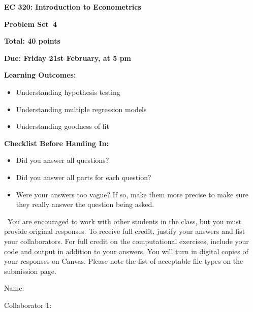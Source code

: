 \documentclass[11pt]{article}
\begin{document}
\begin{onehalfspacing}

\begin{center}
\textbf{EC 320: Introduction to Econometrics} \bigskip

\textbf{Problem Set\bigskip\ 4}
\bigskip
\end{center}


\noindent \textbf{Total: 40 points}

\noindent \textbf{Due: Friday 21st February, at 5 pm}

\bigskip

\noindent \textbf{Learning Outcomes:}
\begin{itemize}
\item Understanding hypothesis testing
\item Understanding multiple regression models
\item Understanding goodness of fit 
\end{itemize}

\bigskip


\noindent \textbf{Checklist Before Handing In:}
\begin{itemize}
\item Did you answer all questions?
\item Did you answer all parts for each question?
\item Were your answers too vague? If so, make them more precise to make sure they really answer the question being asked.
\end{itemize}

\bigskip

\ You are encouraged to work with other students in the class, but you must provide original responses. To receive full credit, justify your answers and list your collaborators. For full credit on the computational exercises, include your code and output in addition to your answers. You will turn in digital copies of your responses on Canvas. Please note the list of acceptable file types on the submission page.  \\
\vspace{0.1in}

Name: 			\\
\vspace{0.1in}

Collaborator 1: \\

\vspace{0.1in}


\end{onehalfspacing}
\end{document}
